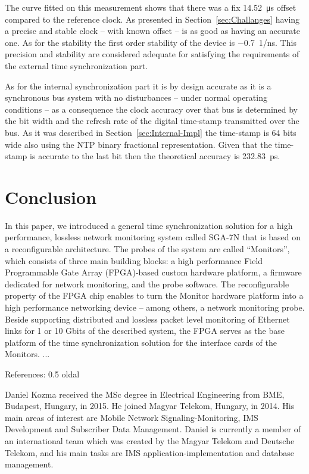 \documentclass[journal]{IEEEtran}
\begin{document}
The curve fitted on this measurement shows that there was a fix \SI{14.52}{\micro\second} offset compared to the
reference clock. As presented in Section~\ref{sec:Challanges}
having a precise and stable clock -- with known offset -- is as good as having an accurate one. As for the stability
the first order stability of the
device is \SI{-0.7}{1/\nano\second}. This precision and stability are considered adequate for satisfying the
requirements of the external time synchronization part.

As for the internal synchronization part it is by design accurate as it is a synchronous bus system with no
disturbances -- under normal operating conditions -- as a
consequence the clock accuracy over that bus is determined by the bit width and the refresh rate of the digital
time-stamp transmitted over the bus. As it was described in Section~\ref{sec:Internal-Impl} the
time-stamp is 64 bits wide also using the NTP binary fractional representation. Given that the time-stamp is accurate
to the last bit then the theoretical accuracy is \SI{232.83}{\pico\second}.

\section{Conclusion}

In this paper, we introduced a general time synchronization solution for a high performance, lossless network monitoring system called SGA-7N that is based on a reconfigurable architecture. The probes of the system are called ``Monitors'', which consists of three main building blocks: a high performance Field Programmable Gate Array (FPGA)-based custom hardware platform, a firmware dedicated for network monitoring, and the probe software. The reconfigurable property of the FPGA chip enables to turn the Monitor hardware platform into a high performance networking device -- among others, a network monitoring probe. Beside supporting distributed and lossless packet level monitoring of Ethernet links for 1 or 10 Gbit\/s of the described system, the FPGA serves as the base platform of the time synchronization solution for the interface cards of the Monitors.
...

References: 0.5 oldal


\begin{IEEEbiography}{Daniel Kozma} received the MSc degree in Electrical Engineering from BME, Budapest, Hungary, in 2015.
He joined Magyar Telekom, Hungary, in 2014.
His main areas of interest are Mobile Network Signaling-Monitoring, IMS Development and Subscriber Data Management. Daniel is currently a member of an international team which was created by the Magyar Telekom and Deutsche Telekom, and his main tasks are IMS application-implementation and database management.
\end{IEEEbiography}
\end{document}
